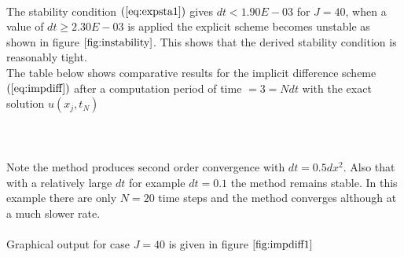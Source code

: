 \documentclass[11pt]{article}
\begin{document}
\\The stability condition $(\ref{eq:expsta1})$ gives $dt<1.90E-03$ for $J=40$, when a value of $dt\geq2.30E-03$ is applied the explicit scheme becomes unstable as shown in figure $\ref{fig:instability}$. This shows that the derived stability condition is reasonably tight.\\
The table below shows comparative results for the implicit difference scheme $(\ref{eq:impdiff})$ after a computation period of time $= 3 = Ndt$ with the exact solution $u(x_j,t_N)$ \\
\\
\\
\\
Note the method produces second order convergence with $dt = 0.5dx^2$. Also that with a relatively large $dt$ for example $dt = 0.1$ the method remains stable. In this example there are only $N=20$ time steps and the method converges although at a much slower rate.\\
\\Graphical output for case $J=40$ is given in figure $\ref{fig:impdiff1}$
\end{document}
